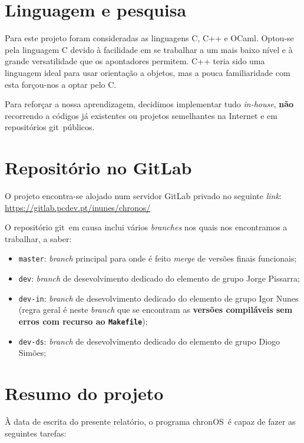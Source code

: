 \documentclass[10pt,oneside]{estiloUBI}
\newcommand{\chronOS}{\textsf{chronOS}}
\newcommand{\git}{\textsf{git}}
\begin{document}
	\section{Linguagem e pesquisa}
	\label{ssec:dev:sota}
	
	Para este projeto foram consideradas as linguagens C, C++ e OCaml. Optou-se pela linguagem C devido à facilidade em se trabalhar a um mais baixo nível e à grande versatilidade que os apontadores permitem. C++ teria sido uma linguagem ideal para usar orientação a objetos, mas a pouca familiaridade com esta forçou-nos a optar pelo C.
	
	Para reforçar a nossa aprendizagem, decidimos implementar tudo \textit{in-house}, \textbf{não} recorrendo a códigos já existentes ou projetos semelhantes na Internet e em repositórios \git~públicos.
	
	
	\section{Repositório no GitLab}
	\label{ssec:dev:gitlab}
	
	O projeto encontra-se alojado num servidor GitLab privado no seguinte \textit{link}: \url{https://gitlab.pcdev.pt/inunes/chronos/}
	
	O repositório \git~em causa inclui vários \textit{branches} nos quais nos encontramos a trabalhar, a saber:
	
	\begin{itemize}
		\item \texttt{master}: \textit{branch} principal para onde é feito \textit{merge} de versões finais funcionais;
		\item \texttt{dev}: \textit{branch} de desevolvimento dedicado do elemento de grupo Jorge Pissarra;
		\item \texttt{dev-in}: \textit{branch} de desevolvimento dedicado do elemento de grupo Igor Nunes (regra geral é neste \textit{branch} que se encontram as \textbf{versões compiláveis sem erros com recurso ao \texttt{Makefile}});
		\item \texttt{dev-ds}: \textit{branch} de desevolvimento dedicado do elemento de grupo Diogo Simões;
	\end{itemize}
	

	\section{Resumo do projeto}
	\label{ssec:dev:summary}
	
	À data de escrita do presente relatório, o programa \chronOS~é capaz de fazer as seguintes tarefas:
	
\end{document}
